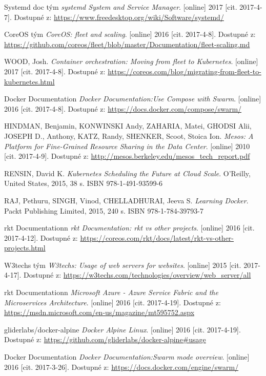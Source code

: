 \begin{thebibliography}{10}
Systemd doc tým
	\emph{systemd System and Service Manager}. {[}online] 2017 {[}cit. 2017-4-7]. Dostupné z: \url{https://www.freedesktop.org/wiki/Software/systemd/}	

CoreOS tým
	\emph{CoreOS: fleet and scaling}. {[}online] 2016 {[}cit. 2017-4-8]. Dostupné z: \url{https://github.com/coreos/fleet/blob/master/Documentation/fleet-scaling.md}	

WOOD, Josh.
	\emph{Container orchestration: Moving from fleet to Kubernetes}. {[}online] 2017 {[}cit. 2017-4-8]. Dostupné z: \url{https://coreos.com/blog/migrating-from-fleet-to-kubernetes.html}	
  
 Docker Documentation 
	\emph{Docker Documentation:Use Compose with Swarm}. {[}online] 2016 {[}cit. 2017-4-8]. Dostupné z: \url{https://docs.docker.com/compose/swarm/}    

 HINDMAN, Benjamin, KONWINSKI Andy, ZAHARIA, Matei, GHODSI Alii, JOSEPH D., Anthony, KATZ, Randy, SHENKER, Scoot, Stoica Ion. 
	\emph{Mesos: A Platform for Fine-Grained Resource Sharing in the Data Center}. {[}online] 2010 {[}cit. 2017-4-9]. Dostupné z: \url{http://mesos.berkeley.edu/mesos_tech_report.pdf}   

 RENSIN, David K. 
  \emph{Kubernetes Scheduling the Future at Cloud Scale}. O'Reilly, United States, 2015, 38 s. ISBN 978-1-491-93599-6

 RAJ,  Pethuru, SINGH, Vinod, CHELLADHURAI, Jeeva S. 
  \emph{Learning Docker}. Packt Publishing Limited, 2015, 240 s. ISBN 978-1-784-39793-7

 rkt Documentationn
	\emph{rkt Documentation: rkt vs other projects}. {[}online] 2016 {[}cit. 2017-4-12]. Dostupné z: \url{https://coreos.com/rkt/docs/latest/rkt-vs-other-projects.html}

 W3techs tým
    \emph{W3techs: Usage of web servers for websites}. {[}online] 2015 {[}cit. 2017-4-17]. Dostupné z: \url{https://w3techs.com/technologies/overview/web_server/all}

 rkt Documentationn
	\emph{Microsoft Azure - Azure Service Fabric and the Microservices Architecture}. {[}online] 2016 {[}cit. 2017-4-19]. Dostupné z: \url{https://msdn.microsoft.com/en-us/magazine/mt595752.aspx}

 gliderlabs/docker-alpine
	\emph{Docker Alpine Linux}. {[}online] 2016 {[}cit. 2017-4-19]. Dostupné z: \url{https://github.com/gliderlabs/docker-alpine#usage}

 Docker Documentation 
	\emph{Docker Documentation:Swarm mode overview}. {[}online] 2016 {[}cit. 2017-3-26]. Dostupné z: \url{https://docs.docker.com/engine/swarm/}
	
\end{thebibliography}
